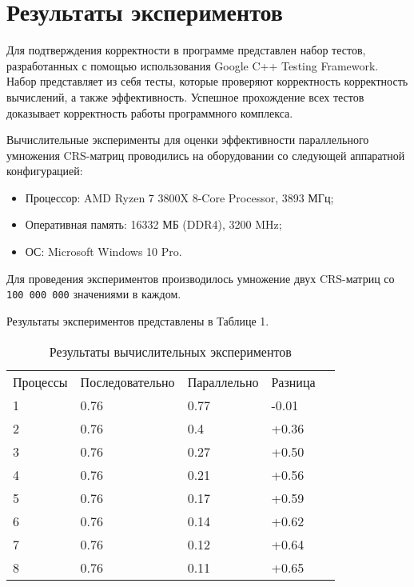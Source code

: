 \documentclass{report}
\begin{document}
\section*{Результаты экспериментов}
Для подтверждения корректности в программе представлен набор тестов, разработанных с помощью использования Google C++ Testing Framework. Набор представляет из себя тесты, которые проверяют корректность корректность вычислений, а также эффективность. Успешное прохождение всех тестов доказывает корректность работы программного комплекса.
\par Вычислительные эксперименты для оценки эффективности параллельного умножения CRS-матриц проводились на оборудовании со следующей аппаратной конфигурацией:

\begin{itemize}
\item Процессор: AMD Ryzen 7 3800X 8-Core Processor, 3893 МГц;
\item Оперативная память: 16332 МБ (DDR4), 3200 MHz;
\item ОС: Microsoft Windows 10 Pro.
\end{itemize}

\par Для проведения экспериментов производилось умножение двух CRS-матриц со 
\verb|100 000 000| значениями в каждом. 
\par Результаты экспериментов представлены в Таблице 1.

\begin{table}[!h]
\caption{Результаты вычислительных экспериментов}
\centering
\begin{tabular}{lllll}
Процессы & Последовательно & Параллельно & Разница  \\
1        & 0.76            & 0.77        & -0.01       \\
2        & 0.76            & 0.4         & +0.36       \\
3        & 0.76            & 0.27        & +0.50       \\
4        & 0.76            & 0.21        & +0.56       \\
5        & 0.76            & 0.17        & +0.59       \\
6        & 0.76            & 0.14        & +0.62       \\
7        & 0.76            & 0.12        & +0.64       \\
8        & 0.76            & 0.11        & +0.65
\end{tabular}
\end{table}
\end{document}
